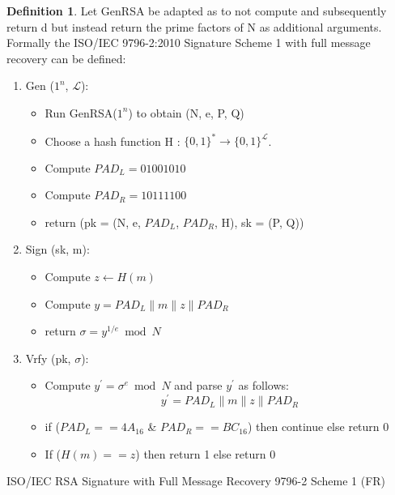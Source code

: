 \documentclass[]{final_report}
\theoremstyle{definition}
\newtheorem{definition}{Definition}[chapter]
\begin{document}
\begin{definition}
Let GenRSA be adapted as to not compute and subsequently return d but instead return the prime factors of N as additional arguments. Formally the ISO/IEC 9796-2:2010 Signature Scheme 1 with full message recovery can be defined:
\begin{enumerate}
    \item Gen ($1^n$, $\mathcal{L}$): 
    \begin{itemize}
    \item[] Run GenRSA($1^n$) to obtain (N, e, P, Q)
    \item[] Choose a hash function H : $\{0, 1\}^* \rightarrow \{0, 1\}^\mathcal{L}$.
    \item[] Compute $PAD_{L} = 01001010$
    \item[] Compute $PAD_{R} = 10111100$
    \item[] return (pk = (N, e, $PAD_{L}$, $PAD_{R}$, H), sk = (P, Q))
    \end{itemize}

    \item Sign (sk, m):
    \begin{itemize}
    \item[] Compute $z \leftarrow H(m)$
    \item[] Compute $y = PAD_{L} \| m \| z \| PAD_{R}$
    \item[] return $\sigma = y^{1/e} \bmod N$
    \end{itemize}
   
    \item Vrfy (pk, $\sigma$):  
    \begin{itemize}
    \item[] Compute $y^{'} = \sigma^{e} \bmod N$ and parse $y^{'}$ as follows:
    \[y^{'} = PAD_{L} \| m \| z \| PAD_{R}\]
    \item[] if ($PAD_{L} == 4A_{16}$ \& $PAD_{R} == BC_{16}$) then continue else return 0
    \item[] If ($H(m) == z$) then return 1 else return 0
    \end{itemize}
\end{enumerate}
ISO/IEC RSA Signature with Full Message Recovery 9796-2 Scheme 1 (FR)
\end{definition}
\end{document}
